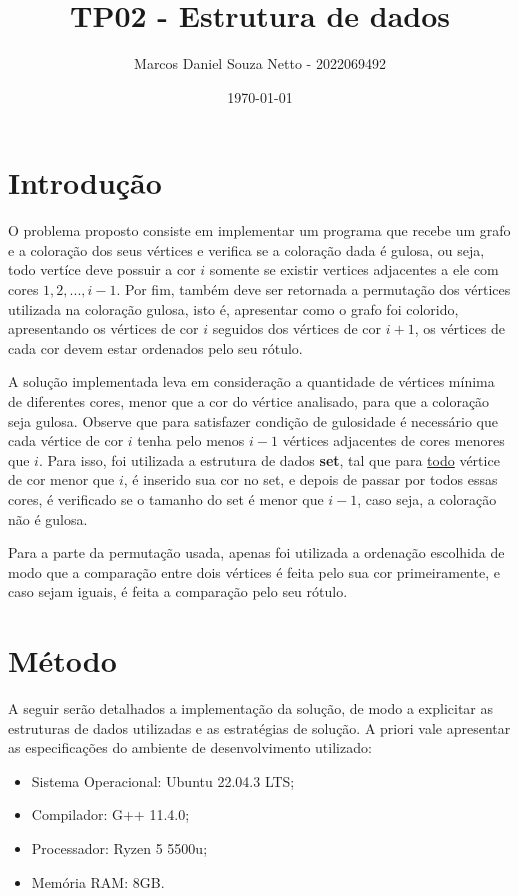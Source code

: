 \documentclass{article}
\title{TP02 - Estrutura de dados}
\author{Marcos Daniel Souza Netto - 2022069492}
\date{\today}
\begin{document}
\maketitle

\section{Introdução}

O problema proposto consiste em implementar um programa que recebe um grafo 
e a coloração dos seus vértices e verifica se a coloração dada é gulosa, ou seja,
todo vertíce deve possuir a cor $i$ somente se existir vertices adjacentes
a ele com cores $1, 2, ..., i-1$. Por fim, também deve ser retornada a permutação
dos vértices utilizada na coloração gulosa, isto é, apresentar como o grafo foi 
colorido, apresentando os vértices de cor $i$ seguidos dos vértices de cor $i+1$, 
os vértices de cada cor devem estar ordenados pelo seu rótulo.

A solução implementada leva em consideração a quantidade de vértices mínima de diferentes cores, 
menor que a cor do vértice analisado, para que a coloração seja gulosa. Observe que para satisfazer 
condição de gulosidade é necessário que cada vértice de cor $i$ tenha pelo menos $i-1$ vértices adjacentes 
de cores menores que $i$. Para isso, foi utilizada a estrutura de dados \textbf{set}, tal que para \underline{todo} vértice
de cor menor que $i$, é inserido sua cor no set, e depois de passar por todos essas cores, é verificado se o tamanho do set 
é menor que $i-1$, caso seja, a coloração não é gulosa.

Para a parte da permutação usada, apenas foi utilizada a ordenação escolhida de modo que a comparação entre dois vértices é feita 
pelo sua cor primeiramente, e caso sejam iguais, é feita a comparação pelo seu rótulo.

\section{Método}

A seguir serão detalhados a implementação da solução, de modo a explicitar 
as estruturas de dados utilizadas e as estratégias de solução. A priori vale 
apresentar as especificações do ambiente de desenvolvimento utilizado:

\begin{itemize}
    \item Sistema Operacional: Ubuntu 22.04.3 LTS;
    \item Compilador: G++ 11.4.0;
    \item Processador: Ryzen 5 5500u;
    \item Memória RAM: 8GB.
\end{itemize}
\end{document}
